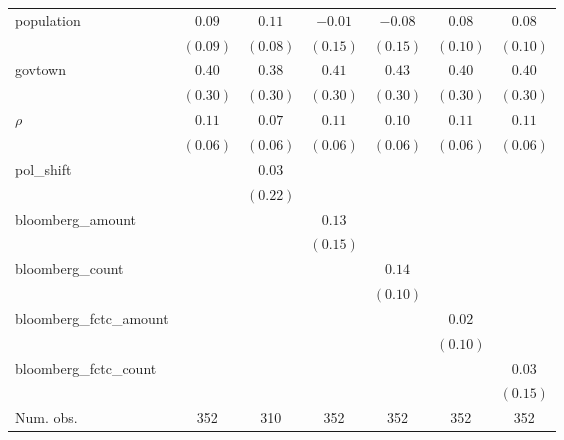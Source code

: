 \begin{table}[!h]
\begin{center}
\begin{tabular}{l c c c c c c }
population              & $0.09$       & $0.11$       & $-0.01$      & $-0.08$      & $0.08$       & $0.08$       \\
                        & $(0.09)$     & $(0.08)$     & $(0.15)$     & $(0.15)$     & $(0.10)$     & $(0.10)$     \\
govtown                 & $0.40$       & $0.38$       & $0.41$       & $0.43$       & $0.40$       & $0.40$       \\
                        & $(0.30)$     & $(0.30)$     & $(0.30)$     & $(0.30)$     & $(0.30)$     & $(0.30)$     \\
$\rho$                  & $0.11$       & $0.07$       & $0.11$       & $0.10$       & $0.11$       & $0.11$       \\
                        & $(0.06)$     & $(0.06)$     & $(0.06)$     & $(0.06)$     & $(0.06)$     & $(0.06)$     \\
pol\_shift              &              & $0.03$       &              &              &              &              \\
                        &              & $(0.22)$     &              &              &              &              \\
bloomberg\_amount       &              &              & $0.13$       &              &              &              \\
                        &              &              & $(0.15)$     &              &              &              \\
bloomberg\_count        &              &              &              & $0.14$       &              &              \\
                        &              &              &              & $(0.10)$     &              &              \\
bloomberg\_fctc\_amount &              &              &              &              & $0.02$       &              \\
                        &              &              &              &              & $(0.10)$     &              \\
bloomberg\_fctc\_count  &              &              &              &              &              & $0.03$       \\
                        &              &              &              &              &              & $(0.15)$     \\
\midrule
Num. obs.               & 352          & 310          & 352          & 352          & 352          & 352          \\

\end{tabular}
\end{center}
\end{table}
